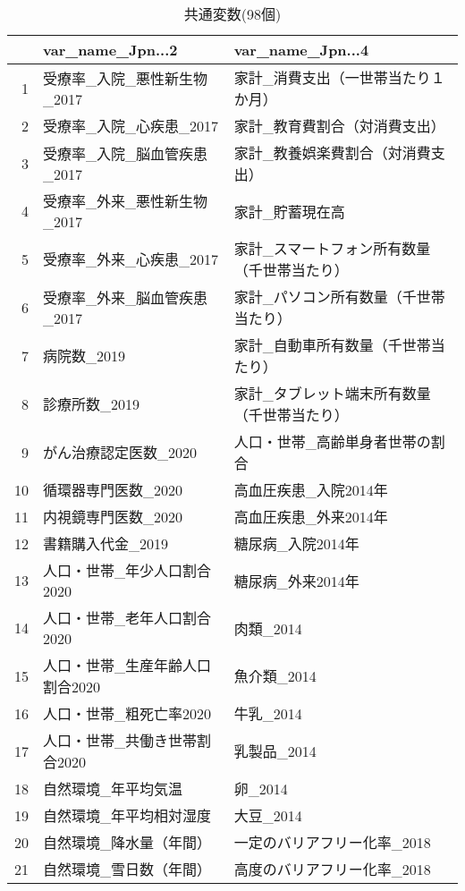 \begin{table}[H]
\centering
\caption{共通変数(98個)}
\label{table_commom_d2.tex}
\begingroup\tiny

\begin{adjustbox}{width=1\textwidth}
\begin{tabular}{rll}
  \hline
 & var\_name\_Jpn...2 & var\_name\_Jpn...4 \\
  \hline
1 & 受療率\_入院\_悪性新生物\_2017 & 家計\_消費支出（一世帯当たり１か月） \\
  2 & 受療率\_入院\_心疾患\_2017 & 家計\_教育費割合（対消費支出） \\
  3 & 受療率\_入院\_脳血管疾患\_2017 & 家計\_教養娯楽費割合（対消費支出） \\
  4 & 受療率\_外来\_悪性新生物\_2017 & 家計\_貯蓄現在高 \\
  5 & 受療率\_外来\_心疾患\_2017 & 家計\_スマートフォン所有数量（千世帯当たり） \\
  6 & 受療率\_外来\_脳血管疾患\_2017 & 家計\_パソコン所有数量（千世帯当たり） \\
  7 & 病院数\_2019 & 家計\_自動車所有数量（千世帯当たり） \\
  8 & 診療所数\_2019 & 家計\_タブレット端末所有数量（千世帯当たり） \\
  9 & がん治療認定医数\_2020 & 人口・世帯\_高齢単身者世帯の割合 \\
  10 & 循環器専門医数\_2020 & 高血圧疾患\_入院2014年 \\
  11 & 内視鏡専門医数\_2020 & 高血圧疾患\_外来2014年 \\
  12 & 書籍購入代金\_2019 & 糖尿病\_入院2014年 \\
  13 & 人口・世帯\_年少人口割合2020 & 糖尿病\_外来2014年 \\
  14 & 人口・世帯\_老年人口割合2020 & 肉類\_2014 \\
  15 & 人口・世帯\_生産年齢人口割合2020 & 魚介類\_2014 \\
  16 & 人口・世帯\_粗死亡率2020 & 牛乳\_2014 \\
  17 & 人口・世帯\_共働き世帯割合2020 & 乳製品\_2014 \\
  18 & 自然環境\_年平均気温 & 卵\_2014 \\
  19 & 自然環境\_年平均相対湿度 & 大豆\_2014 \\
  20 & 自然環境\_降水量（年間） & 一定のバリアフリー化率\_2018 \\
  21 & 自然環境\_雪日数（年間） & 高度のバリアフリー化率\_2018 \\

\end{tabular}
\end{adjustbox}
\end{table}
